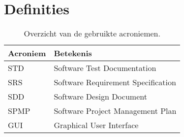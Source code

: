 \chapter{Definities}
\begin{table} [H]
    \centering
    \caption{Overzicht van de gebruikte acroniemen.}
\begin{tabular}{l|l}
    Acroniem & Betekenis \\
    \hline
    STD & Software Test Documentation \\
    SRS & Software Requirement Specification \\
    SDD & Software Design Document \\
    SPMP & Software Project Management Plan \\
    GUI & Graphical User Interface
\end{tabular}
\end{table}